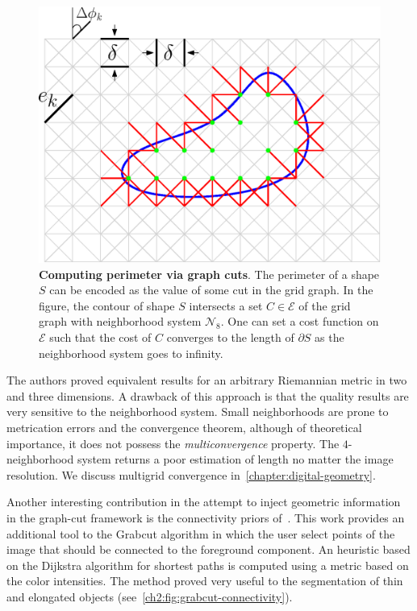 \begin{figure}
\center
\includegraphics[scale=0.5]{figures/chapter2/perimeter-graph-cuts/geodesics.eps}
\caption{\textbf{Computing perimeter via graph cuts}. The perimeter of a shape $S$ can be encoded as the value of some cut in the grid graph. In the figure, the contour of shape $S$ intersects a set $C \in \mathcal{E}$ of the grid graph with neighborhood system $\mathcal{N}_8$. One can set a cost function on $\mathcal{E}$ such that the cost of $C$ converges to the length of $\partial S$ as the neighborhood system goes to infinity.}
\label{ch2:fig:geodesic-grid-graph-shape-intersection}
\end{figure}

The authors proved equivalent results for an arbitrary Riemannian metric in two and three dimensions. A drawback of this approach is that the quality results are very sensitive to the neighborhood system. Small neighborhoods are prone to metrication errors and the convergence theorem, although of theoretical importance, it does not possess the \emph{multiconvergence} property. The $4$-neighborhood system returns a poor estimation of length no matter the image resolution. We discuss multigrid convergence in~\cref{chapter:digital-geometry}.

Another interesting contribution in the attempt to inject geometric information in the graph-cut framework is the connectivity priors of~\cite{vicente08graph}. This work provides an additional tool to the Grabcut algorithm in which the user select points of the image that should be connected to the foreground component. An heuristic based on the Dijkstra algorithm for shortest paths is computed using a metric based on the color intensities. The method proved very useful to the segmentation of thin and elongated objects (see~\cref{ch2:fig:grabcut-connectivity}).

